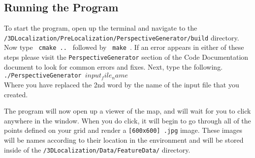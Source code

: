 \documentclass[a4paper,11pt]{article}
\begin{document}
 \subsection{Running the Program}
  To start the program, open up the terminal and navigate to the \texttt{/3DLocalization/PreLocalization/PerspectiveGenerator/build} directory. Now type \texttt{  cmake ..  } followed by \texttt{  make  }. If an error appears in either of these steps please visit the \texttt{PerspectiveGenerator} section of the Code Documentation document to look for common errors and fixes. Next, type the following. \\
  \texttt{./PerspectiveGenerator $input_file_name$} \\
  Where you have replaced the 2nd word by the name of the input file that you created.

  The program will now open up a viewer of the map, and will wait for you to click anywhere in the window. When you do click, it will begin to go through all of the points defined on your grid and render a \texttt{[600x600] .jpg} image. These images will be names according to their location in the environment and will be stored inside of the \texttt{/3DLocalization/Data/FeatureData/} directory.
\end{document}
